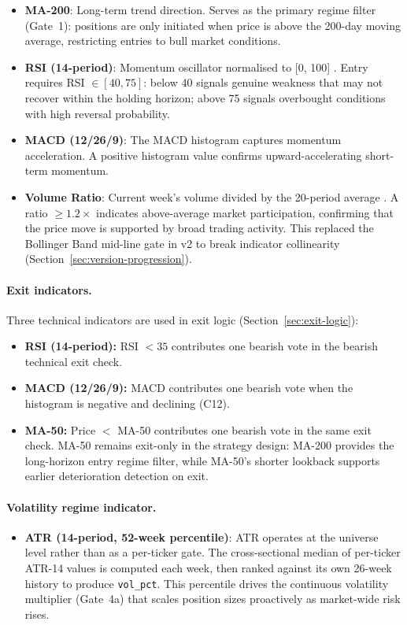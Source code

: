 \documentclass[11pt,twoside,a4paper]{article}
\begin{document}
\begin{itemize}
    \item \textbf{MA-200}: Long-term trend direction. Serves as the primary regime filter (Gate~1): positions are only initiated when price is above the 200-day moving average, restricting entries to bull market conditions.
    \item \textbf{RSI (14-period)}: Momentum oscillator normalised to [0, 100] \citep{Wilder1978}. Entry requires RSI $\in [40, 75]$: below 40 signals genuine weakness that may not recover within the holding horizon; above 75 signals overbought conditions with high reversal probability.
    \item \textbf{MACD (12/26/9)}: The MACD histogram captures momentum acceleration. A positive histogram value confirms upward-accelerating short-term momentum.
    \item \textbf{Volume Ratio}: Current week's volume divided by the 20-period average \citep{Blume1994}. A ratio $\geq 1.2\times$ indicates above-average market participation, confirming that the price move is supported by broad trading activity. This replaced the Bollinger Band mid-line gate in v2 to break indicator collinearity (Section~\ref{sec:version-progression}).
\end{itemize}

\paragraph{Exit indicators.}
Three technical indicators are used in exit logic (Section~\ref{sec:exit-logic}):
\begin{itemize}
    \item \textbf{RSI (14-period):} RSI $< 35$ contributes one bearish vote in the bearish technical exit check.
    \item \textbf{MACD (12/26/9):} MACD contributes one bearish vote when the histogram is negative and declining (C12).
    \item \textbf{MA-50:} Price $<$ MA-50 contributes one bearish vote in the same exit check. MA-50 remains exit-only in the strategy design: MA-200 provides the long-horizon entry regime filter, while MA-50's shorter lookback supports earlier deterioration detection on exit.
\end{itemize}

\paragraph{Volatility regime indicator.}
\begin{itemize}
    \item \textbf{ATR (14-period, 52-week percentile)}: ATR operates at the universe level rather than as a per-ticker gate. The cross-sectional median of per-ticker ATR-14 values is computed each week, then ranked against its own 26-week history to produce \texttt{vol\_pct}. This percentile drives the continuous volatility multiplier (Gate~4a) that scales position sizes proactively as market-wide risk rises.
\end{itemize}
\end{document}
